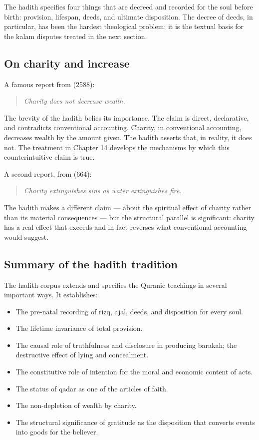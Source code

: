 The hadith specifies four things that are decreed and recorded for
the soul before birth: provision, lifespan, deeds, and ultimate
disposition. The decree of deeds, in particular, has been the
hardest theological problem; it is the textual basis for the kalam
disputes treated in the next section.

\subsection{On charity and increase}

A famous report from  (2588):

\begin{quote}
\textit{Charity does not decrease wealth.}
\end{quote}

The brevity of the hadith belies its importance. The claim is
direct, declarative, and contradicts conventional accounting.
Charity, in conventional accounting, decreases wealth by the amount
given. The hadith asserts that, in reality, it does not. The
treatment in Chapter 14 develops the mechanisms by which this
counterintuitive claim is true.

A second report, from  (664):

\begin{quote}
\textit{Charity extinguishes sins as water extinguishes fire.}
\end{quote}

The hadith makes a different claim --- about the spiritual effect of
charity rather than its material consequences --- but the structural
parallel is significant: charity has a real effect that exceeds and
in fact reverses what conventional accounting would suggest.

\subsection{Summary of the hadith tradition}

The hadith corpus extends and specifies the Quranic teachings in
several important ways. It establishes:

\begin{itemize}[leftmargin=2em]
    \item The pre-natal recording of rizq, ajal, deeds, and
    disposition for every soul.
    \item The lifetime invariance of total provision.
    \item The causal role of truthfulness and disclosure in
    producing barakah; the destructive effect of lying and
    concealment.
    \item The constitutive role of intention for the moral and
    economic content of acts.
    \item The status of qadar as one of the articles of faith.
    \item The non-depletion of wealth by charity.
    \item The structural significance of gratitude as the
    disposition that converts events into goods for the believer.
\end{itemize}

